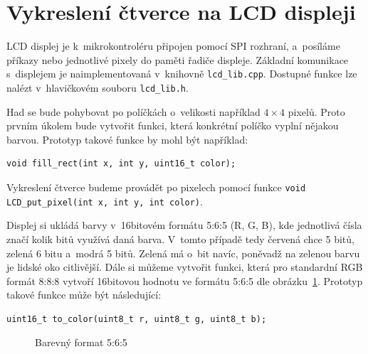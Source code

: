 \documentclass[12pt]{article}
\begin{document}
\section{Vykreslení čtverce na LCD displeji}
LCD displej je k~mikrokontroléru připojen pomocí SPI rozhraní, a~posíláme příkazy nebo jednotlivé pixely do paměti řadiče displeje.
Základní komunikace s~displejem je naimplementovaná v~knihovně \texttt{lcd\_lib.cpp}.
Dostupné funkce lze nalézt v~hlavičkovém souboru \texttt{lcd\_lib.h}.

Had se bude pohybovat po políčkách o~velikosti například $4\times4$ pixelů.
Proto prvním úkolem bude vytvořit funkci, která konkrétní políčko vyplní nějakou barvou.
Prototyp takové funkce by mohl být například:
\begin{verbatim}
void fill_rect(int x, int y, uint16_t color);
\end{verbatim}
Vykreslení čtverce budeme provádět po pixelech pomocí funkce \texttt{void LCD_put_pixel(int x, int y, int color)}.

Displej si ukládá barvy v~16bitovém formátu 5:6:5 (R, G, B), kde jednotlivá čísla značí kolik bitů využívá daná barva.
V~tomto případě tedy červená chce 5 bitů, zelená 6 bitu a~modrá 5 bitů.
Zelená má o~bit navíc, poněvadž na zelenou barvu je lidské oko citlivější.
Dále si můžeme vytvořit funkci, která  pro standardní RGB formát 8:8:8 vytvoří 16bitovou hodnotu ve formátu 5:6:5 dle obrázku~\ref{fig:rgb565}.
Prototyp takové funkce může být následující:
\begin{verbatim}
uint16_t to_color(uint8_t r, uint8_t g, uint8_t b);
\end{verbatim}

\begin{figure}[ht]
	\centering
	\caption{Barevný format 5:6:5}
  \label{fig:rgb565}
\end{figure}
\end{document}
